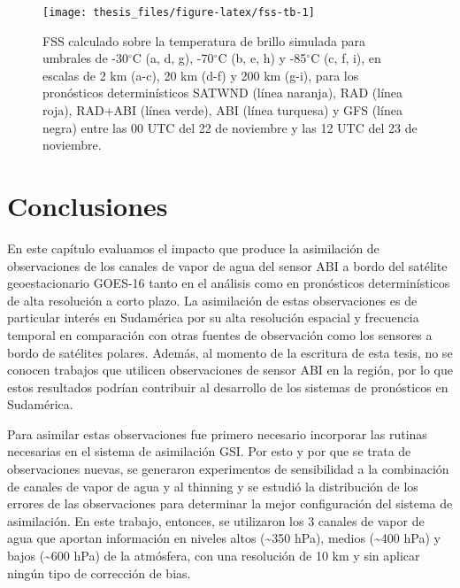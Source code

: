 \documentclass[12pt,oneside,a4paper]{reedthesis}
\begin{document}
\begin{figure}
\texttt{[image: thesis\_files/figure-latex/fss-tb-1]} \caption{FSS calculado sobre la temperatura de brillo simulada para umbrales de -30\(^\circ\)C (a, d, g), -70\(^\circ\)C (b, e, h) y -85\(^\circ\)C (c, f, i), en escalas de 2 km (a-c), 20 km (d-f) y 200 km (g-i), para los pronósticos determinísticos SATWND (línea naranja), RAD (línea roja), RAD+ABI (línea verde), ABI (línea turquesa) y GFS (línea negra) entre las 00 UTC del 22 de noviembre y las 12 UTC del 23 de noviembre.}\label{fig:fss-tb}
\end{figure}
\hypertarget{conclusiones-2}{%
\section{Conclusiones}\label{conclusiones-2}}

En este capítulo evaluamos el impacto que produce la asimilación de observaciones de los canales de vapor de agua del sensor ABI a bordo del satélite geoestacionario GOES-16 tanto en el análisis como en pronósticos determinísticos de alta resolución a corto plazo. La asimilación de estas observaciones es de particular interés en Sudamérica por su alta resolución espacial y frecuencia temporal en comparación con otras fuentes de observación como los sensores a bordo de satélites polares. Además, al momento de la escritura de esta tesis, no se conocen trabajos que utilicen observaciones de sensor ABI en la región, por lo que estos resultados podrían contribuir al desarrollo de los sistemas de pronósticos en Sudamérica.

Para asimilar estas observaciones fue primero necesario incorporar las rutinas necesarias en el sistema de asimilación GSI. Por esto y por que se trata de observaciones nuevas, se generaron experimentos de sensibilidad a la combinación de canales de vapor de agua y al thinning y se estudió la distribución de los errores de las observaciones para determinar la mejor configuración del sistema de asimilación. En este trabajo, entonces, se utilizaron los 3 canales de vapor de agua que aportan información en niveles altos (\textasciitilde350 hPa), medios (\textasciitilde400 hPa) y bajos (\textasciitilde600 hPa) de la atmósfera, con una resolución de 10 km y sin aplicar ningún tipo de corrección de bias.
\end{document}
